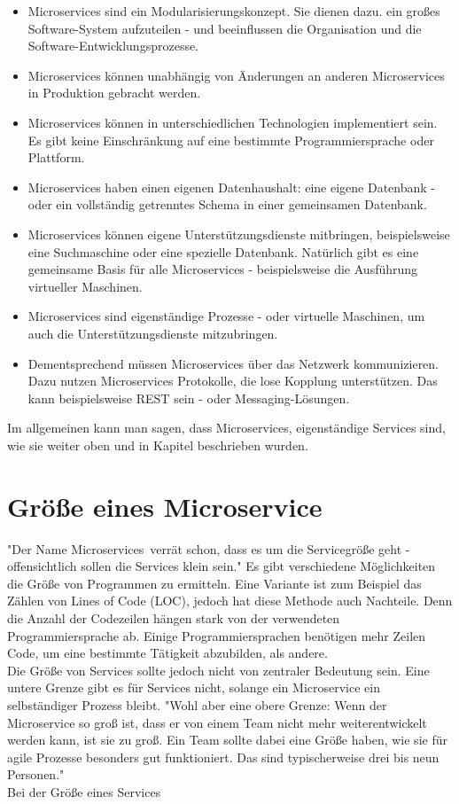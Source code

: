 \begin{itemize}
    \item Microservices sind ein Modularisierungskonzept. Sie dienen dazu. ein großes Software-System aufzuteilen - und beeinflussen die Organisation und die Software-Entwicklungsprozesse.
    \item Microservices können unabhängig von Änderungen an anderen Microservices in Produktion gebracht werden.
    \item Microservices können in unterschiedlichen Technologien implementiert sein. Es gibt keine Einschränkung auf eine bestimmte Programmiersprache oder Plattform.
    \item Microservices haben einen eigenen Datenhaushalt: eine eigene Datenbank - oder ein vollständig getrenntes Schema in einer gemeinsamen Datenbank.
    \item Microservices können eigene Unterstützungsdienste mitbringen, beispielsweise eine Suchmaschine oder eine spezielle Datenbank. Natürlich gibt es eine gemeinsame Basis für alle Microservices - beispielsweise die Ausführung virtueller Maschinen.
    \item Microservices sind eigenständige Prozesse - oder virtuelle Maschinen, um auch die Unterstützungsdienste mitzubringen.
    \item Dementsprechend müssen Microservices über das Netzwerk kommunizieren. Dazu nutzen Microservices Protokolle, die lose Kopplung unterstützen. Das kann beispielsweise REST sein - oder Messaging-Lösungen.
\end{itemize}

Im allgemeinen kann man sagen, dass Microservices, eigenständige Services sind, wie sie weiter oben und in Kapitel  beschrieben wurden.

\section{Größe eines Microservice}
\label{sec:größeMicroservice}
"Der Name \frqq Microservices\flqq\ verrät schon, dass es um die Servicegröße geht - offensichtlich sollen die Services klein sein."\cite[S. 31]{EWolff2016:Microservices} Es gibt verschiedene Möglichkeiten die Größe von Programmen zu ermitteln. Eine Variante ist zum Beispiel das Zählen von  Lines of Code (LOC), jedoch hat diese Methode auch Nachteile. Denn die Anzahl der Codezeilen hängen stark von der verwendeten Programmiersprache ab. Einige Programmiersprachen benötigen mehr Zeilen Code, um eine bestimmte Tätigkeit abzubilden, als andere.
\\
Die Größe von Services sollte jedoch nicht von zentraler Bedeutung sein. Eine untere Grenze gibt es für Services nicht, solange ein Microservice ein selbständiger Prozess bleibt. "Wohl aber eine obere Grenze: Wenn der Microservice so groß ist, dass er von einem Team nicht mehr weiterentwickelt werden kann, ist sie zu groß. Ein Team sollte dabei eine Größe haben, wie sie für agile Prozesse besonders gut funktioniert. Das sind typischerweise drei bis neun Personen."\cite[S. 34]{EWolff2016:Microservices}
\\
Bei der Größe eines Services

